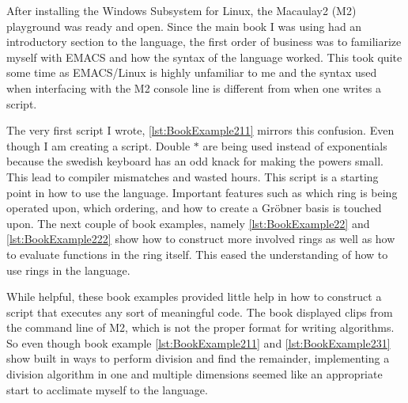 After installing the Windows Subsystem for Linux, the Macaulay2 (M2) playground was ready and open. Since the main book \cite{Applied} I was using had an introductory section to the language, the first order of business was to familiarize myself with EMACS and how the syntax of the language worked. This took quite some time as EMACS/Linux is highly unfamiliar to me and the syntax used when interfacing with the M2 console line is different from when one writes a script. 

The very first script I wrote, \ref{lst:BookExample211} mirrors this confusion. Even though I am creating a script. Double $*$ are being used instead of exponentials because the swedish keyboard has an odd knack for making the powers small. This lead to compiler mismatches and wasted hours. This script is a starting point in how to use the language. Important features such as which ring is being operated upon, which ordering, and how to create a Gröbner basis is touched upon. The next couple of book examples, namely \ref{lst:BookExample22} and \ref{lst:BookExample222} show how to construct more involved rings as well as how to evaluate functions in the ring itself. This eased the understanding of how to use rings in the language.

While helpful, these book examples provided little help in how to construct a script that executes any sort of meaningful code. The book displayed clips from the command line of M2, which is not the proper format for writing algorithms. So even though book example \ref{lst:BookExample211} and \ref{lst:BookExample231} show built in ways to perform division and find the remainder, implementing a division algorithm in one and multiple dimensions seemed like an appropriate start to acclimate myself to the language.


